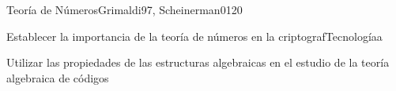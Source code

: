\begin{syllabus}
\begin{unit}{Teoría de Números}{Grimaldi97, Scheinerman01}{20}
   \begin{unitgoals}
      \item Establecer la importancia de la teoría de números en la criptografTecnologíaa
      \item Utilizar las propiedades de las estructuras algebraicas en el estudio de la teoría algebraica de códigos
   \end{unitgoals}
\end{unit}

\begin{coursebibliography}
\end{coursebibliography}

\end{syllabus}

%
